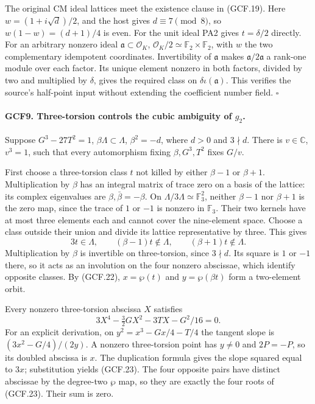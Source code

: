 The original CM ideal lattices meet the existence clause in (GCF.19).
Here \(w=(1+i\sqrt d)/2\), and the host gives
\(d\equiv7\pmod8\), so \(w(1-w)=(d+1)/4\) is even.
For the unit ideal PA2 gives \(t=\delta/2\) directly.
For an arbitrary nonzero ideal \(\mathfrak a\subset\mathcal O_K\),
\(\mathcal O_K/2\simeq\mathbb F_2\times\mathbb F_2\), with
\(w\) the two complementary idempotent coordinates.  Invertibility
of \(\mathfrak a\) makes \(\mathfrak a/2\mathfrak a\) a
rank-one module over each factor.  Its unique element nonzero in
both factors, divided by two and multiplied by \(\delta\), gives
the required class on \(\delta\iota(\mathfrak a)\).
This verifies the source's half-point input without extending the
coefficient number field.
\hfill\(\square\)

\paragraph{GCF9. Three-torsion controls the cubic ambiguity of \(g_2\).}
\label{claim:GCF9}
Suppose \(G^3-27T^2=1\), \(\beta\Lambda\subset\Lambda\),
\(\beta^2=-d\), where \(d>0\) and \(3\nmid d\).
There is \(v\in\mathbb C\), \(v^3=1\), such that every
automorphism fixing \(\beta,G^3,T^2\) fixes \(G/v\).

First choose a three-torsion class \(t\) not killed by either
\(\beta-1\) or \(\beta+1\).  Multiplication by \(\beta\)
has an integral matrix of trace zero on a basis of the lattice:
its complex eigenvalues are \(\beta,\bar\beta=-\beta\).
On \(\Lambda/3\Lambda\simeq\mathbb F_3^2\), neither
\(\beta-1\) nor \(\beta+1\) is the zero map, since the
trace of \(1\) or \(-1\) is nonzero in \(\mathbb F_3\).
Their two kernels have at most three elements each and cannot cover
the nine-element space.  Choose a class outside their union and
divide its lattice representative by three.  This gives
\[
 3t\in\Lambda,\qquad(\beta-1)t\notin\Lambda,\qquad
                              (\beta+1)t\notin\Lambda.          \tag{GCF.22}
\]
Multiplication by \(\beta\) is invertible on three-torsion, since
\(3\nmid d\).  Its square is \(1\) or \(-1\) there, so it
acts as an involution on the four nonzero abscissae, which identify
opposite classes.  By (GCF.22),
\(x=\wp(t)\) and \(y=\wp(\beta t)\) form a two-element orbit.

Every nonzero three-torsion abscissa \(X\) satisfies
\[
 3X^4-\tfrac32GX^2-3TX-G^2/16=0.                    \tag{GCF.23}
\]
For an explicit derivation, on \(y^2=x^3-Gx/4-T/4\) the tangent
slope is \((3x^2-G/4)/(2y)\).  A nonzero three-torsion point has
\(y\ne0\) and \(2P=-P\), so its doubled abscissa is \(x\).
The duplication formula gives the slope squared equal to \(3x\);
substitution yields (GCF.23).  The four opposite pairs have distinct
abscissae by the degree-two \(\wp\) map, so they are exactly the
four roots of (GCF.23).  Their sum is zero.

